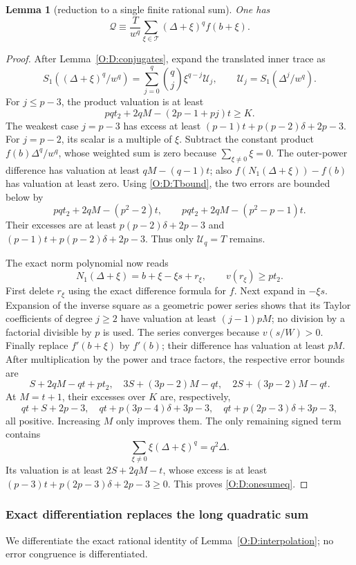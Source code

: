\documentclass[11pt]{amsart}
\newtheorem{lemma}[theorem]{Lemma}
\theoremstyle{definition}
\theoremstyle{remark}
\begin{document}
\begin{lemma}[reduction to a single finite rational sum]\label{O:D:onesum}
One has
\begin{equation}\label{O:D:onesumeq}
 \mathcal Q\equiv\frac{T}{w^q}
     \sum_{\xi\in\mathcal T}(\Delta+\xi)^q f(b+\xi).
\end{equation}
\end{lemma}
\begin{proof}
After Lemma~\ref{O:D:conjugates}, expand the translated inner trace as
\[
 S_1((\Delta+\xi)^q/w^q)
 =\sum_{j=0}^q\binom qj\xi^{q-j}\mathcal U_j,
 \qquad \mathcal U_j=S_1(\Delta^j/w^q).
\]
For $j\le p-3$, the product valuation is at least
\[
 pq t_2+2qM-(2p-1+pj)t\ge K.
\]
The weakest case $j=p-3$ has excess at least
$(p-1)t+p(p-2)\delta+2p-3$.
For $j=p-2$, its scalar is a multiple of $\xi$.
Subtract the constant product $f(b)\Delta^q/w^q$, whose weighted
sum is zero because $\sum_{\xi\ne0}\xi=0$.
The outer-power difference has valuation at least $qM-(q-1)t$;
also $f(N_1(\Delta+\xi))-f(b)$ has valuation at least zero.
Using \eqref{O:D:Tbound}, the two errors are bounded below by
\[
 pq t_2+2qM-(p^2-2)t,\qquad
 pq t_2+2qM-(p^2-p-1)t.
\]
Their excesses are at least $p(p-2)\delta+2p-3$ and
$(p-1)t+p(p-2)\delta+2p-3$. Thus only $\mathcal U_q=T$ remains.

The exact norm polynomial now reads
\[
 N_1(\Delta+\xi)=b+\xi-\xi s+r_\xi,
 \qquad v(r_\xi)\ge pt_2.
\]
First delete $r_\xi$ using the exact difference formula for $f$.
Next expand in $-\xi s$. Expansion of the inverse square as a
geometric power series shows that its Taylor coefficients of degree
$j\ge2$ have valuation at least $(j-1)pM$; no division by a
factorial divisible by $p$ is used. The series converges because
$v(s/W)>0$. Finally replace
$f'(b+\xi)$ by $f'(b)$; their difference has valuation at least $pM$.
After multiplication by the power and trace factors, the respective
error bounds are
\[
 S+2qM-qt+pt_2,\quad
 3S+(3p-2)M-qt,\quad
 2S+(3p-2)M-qt.
\]
At $M=t+1$, their excesses over $K$ are, respectively,
\[
 qt+S+2p-3,\quad qt+p(3p-4)\delta+3p-3,\quad
 qt+p(2p-3)\delta+3p-3,
\]
all positive. Increasing $M$ only improves them.
The only remaining signed term contains
\[
 \sum_{\xi\ne0}\xi(\Delta+\xi)^q=q^2\Delta.
\]
Its valuation is at least $2S+2qM-t$, whose excess is at least
$(p-3)t+p(2p-3)\delta+2p-3\ge0$.
This proves \eqref{O:D:onesumeq}.
\end{proof}

\subsubsection*{Exact differentiation replaces the long quadratic sum}
We differentiate the exact rational identity of
Lemma~\ref{O:D:interpolation}; no error congruence is differentiated.
\end{document}
